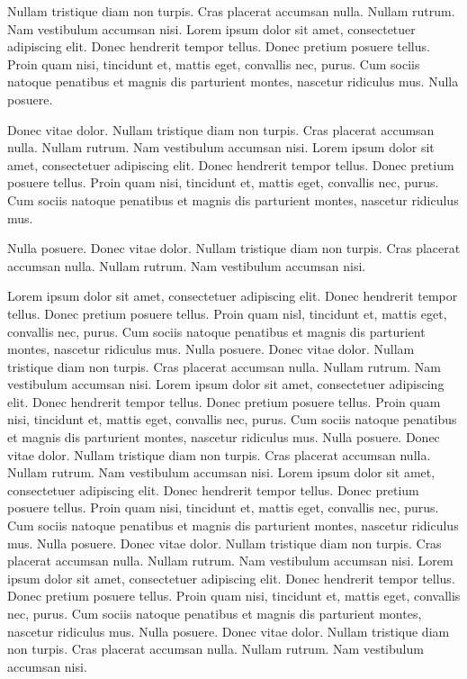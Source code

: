 \documentclass[12pt]{report}
\begin{document}
Nullam tristique diam non turpis. Cras placerat accumsan
nulla. Nullam rutrum. Nam vestibulum accumsan nisi.  Lorem ipsum dolor
sit amet, consectetuer adipiscing elit. Donec hendrerit tempor
tellus. Donec pretium posuere tellus. Proin quam nisi, tincidunt et,
mattis eget, convallis nec, purus. Cum sociis natoque penatibus et
magnis dis parturient montes, nascetur ridiculus mus. Nulla
posuere. 


\begin{eg} 
Donec vitae dolor. Nullam tristique diam non turpis. Cras
placerat accumsan nulla. Nullam rutrum. Nam vestibulum accumsan nisi.
Lorem ipsum dolor sit amet, consectetuer adipiscing elit. Donec
hendrerit tempor tellus. Donec pretium posuere tellus. Proin quam
nisi, tincidunt et, mattis eget, convallis nec, purus. Cum sociis
natoque penatibus et magnis dis parturient montes, nascetur ridiculus
mus. 
\end{eg}

Nulla posuere. Donec vitae dolor. Nullam tristique diam non
turpis. Cras placerat accumsan nulla. Nullam rutrum. Nam vestibulum
accumsan nisi.

Lorem ipsum dolor sit amet, consectetuer adipiscing elit. Donec
hendrerit tempor tellus. Donec pretium posuere tellus. Proin quam
nisl, tincidunt et, mattis eget, convallis nec, purus. Cum sociis
natoque penatibus et magnis dis parturient montes, nascetur ridiculus
mus. Nulla posuere. Donec vitae dolor. Nullam tristique diam non
turpis. Cras placerat accumsan nulla. Nullam rutrum. Nam vestibulum
accumsan nisi.  Lorem ipsum dolor sit amet, consectetuer adipiscing
elit. Donec hendrerit tempor tellus. Donec pretium posuere
tellus. Proin quam nisi, tincidunt et, mattis eget, convallis nec,
purus. Cum sociis natoque penatibus et magnis dis parturient montes,
nascetur ridiculus mus. Nulla posuere. Donec vitae dolor. Nullam
tristique diam non turpis. Cras placerat accumsan nulla. Nullam
rutrum. Nam vestibulum accumsan nisi.  Lorem ipsum dolor sit amet,
consectetuer adipiscing elit. Donec hendrerit tempor tellus. Donec
pretium posuere tellus. Proin quam nisi, tincidunt et, mattis eget,
convallis nec, purus. Cum sociis natoque penatibus et magnis dis
parturient montes, nascetur ridiculus mus. Nulla posuere. Donec vitae
dolor. Nullam tristique diam non turpis. Cras placerat accumsan
nulla. Nullam rutrum. Nam vestibulum accumsan nisi.  Lorem ipsum dolor
sit amet, consectetuer adipiscing elit. Donec hendrerit tempor
tellus. Donec pretium posuere tellus. Proin quam nisi, tincidunt et,
mattis eget, convallis nec, purus. Cum sociis natoque penatibus et
magnis dis parturient montes, nascetur ridiculus mus. Nulla
posuere. Donec vitae dolor. Nullam tristique diam non turpis. Cras
placerat accumsan nulla. Nullam rutrum. Nam vestibulum accumsan nisi.
  
\end{document}

